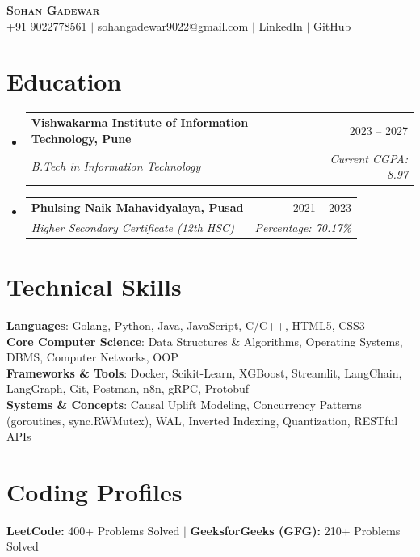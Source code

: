 \documentclass[letterpaper,10pt]{article}
\makeatletter
\newcommand{\resumeSubheading}[4]{
  \vspace{-2pt}\item
    \begin{tabular*}{0.98\textwidth}[t]{l@{\extracolsep{\fill}}r}
      \textbf{#1} & #2 \\
      \textit{\small#3} & \textit{\small #4} \\
    \end{tabular*}\vspace{-6pt}
}
\newcommand{\resumeSubHeadingListStart}{\begin{itemize}[leftmargin=0.15in, label={}]}
\newcommand{\resumeSubHeadingListEnd}{\end{itemize}}
\makeatother
\begin{document}
\begin{center}
    \textbf{\Huge \scshape Sohan Gadewar} \\ \vspace{2pt}
    \small +91 9022778561 $|$ \href{mailto:sohangadewar9022@gmail.com}{\underline{sohangadewar9022@gmail.com}} $|$ 
    \href{https://linkedin.com/in/yourprofile}{\underline{LinkedIn}} $|$
    \href{https://github.com/yourprofile}{\underline{GitHub}}
\end{center}

\section{Education}
  \resumeSubHeadingListStart
    \resumeSubheading
      {Vishwakarma Institute of Information Technology, Pune}{2023 -- 2027}
      {B.Tech in Information Technology}{Current CGPA: 8.97}
    \resumeSubheading
      {Phulsing Naik Mahavidyalaya, Pusad}{2021 -- 2023}
      {Higher Secondary Certificate (12th HSC)}{Percentage: 70.17\%}
  \resumeSubHeadingListEnd

\section{Technical Skills}
 \begin{itemize}[leftmargin=0.15in, label={}]
    \small{\item{
     \textbf{Languages}{: Golang, Python, Java, JavaScript, C/C++, HTML5, CSS3} \\ \vspace{-2pt}
     \textbf{Core Computer Science}{: Data Structures \& Algorithms, Operating Systems, DBMS, Computer Networks, OOP} \\ \vspace{-2pt}
     \textbf{Frameworks \& Tools}{: Docker, Scikit-Learn, XGBoost, Streamlit, LangChain, LangGraph, Git, Postman, n8n, gRPC, Protobuf} \\ \vspace{-2pt}
     \textbf{Systems \& Concepts}{: Causal Uplift Modeling, Concurrency Patterns (goroutines, sync.RWMutex), WAL, Inverted Indexing, Quantization, RESTful APIs}
    }}
 \end{itemize}

\section{Coding Profiles}
 \begin{itemize}[leftmargin=0.15in, label={}]
    \small{\item{
     \textbf{LeetCode:} 400+ Problems Solved \quad $|$ \quad \textbf{GeeksforGeeks (GFG):} 210+ Problems Solved
    }}
 \end{itemize}
\end{document}
